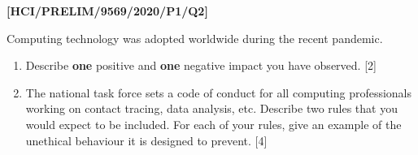 \item \textbf{{[}HCI/PRELIM/9569/2020/P1/Q2{]} }

Computing technology was adopted worldwide during the recent pandemic. 
\begin{enumerate}
\item Describe \textbf{one} positive and \textbf{one} negative impact you
have observed.\hfill{} {[}2{]}
\item The national task force sets a code of conduct for all computing professionals
working on contact tracing, data analysis, etc. Describe two rules
that you would expect to be included. For each of your rules, give
an example of the unethical behaviour it is designed to prevent. \hfill{}{[}4{]}
\end{enumerate}